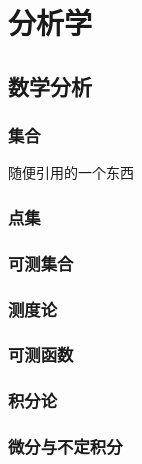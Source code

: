\documentclass[12pt, a4paper, oneside, UTF8]{ctexbook}
\begin{document}
\else
\fi
\part{分析学}
\chapter{数学分析}
\section{集合}
随便引用的一个东西\cite{choy20194d}

\section{点集}

\section{可测集合}

\section{测度论}

\section{可测函数}

\section{积分论}

\section{微分与不定积分}

\ifx\allfiles\undefined
\end{document}
